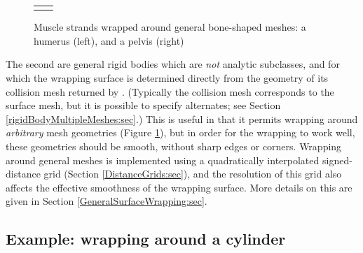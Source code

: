 \begin{figure}[ht]
\begin{center}
\begin{tabular}{cc}
\fi
\end{tabular}
\end{center}
\caption{Muscle strands wrapped around general bone-shaped meshes: a
humerus (left), and a pelvis (right)}
\label{GeneralWrapping:fig}
\end{figure}

The second are general rigid bodies which are {\it not} analytic
subclasses, and for which the wrapping surface is determined directly
from the geometry of its collision mesh returned by
.  (Typically the
collision mesh corresponds to the surface mesh, but it is possible to
specify alternates; see Section \ref{rigidBodyMultipleMeshes:sec}.)
This is useful in that it permits wrapping around {\it arbitrary} mesh
geometries (Figure \ref{GeneralWrapping:fig}), but in order for the
wrapping to work well, these geometries should be smooth, without
sharp edges or corners.  Wrapping around general meshes is implemented
using a quadratically interpolated signed-distance grid (Section
\ref{DistanceGrids:sec}), and the resolution of this grid also affects
the effective smoothness of the wrapping surface. More details on this
are given in Section \ref{GeneralSurfaceWrapping:sec}.

\subsection{Example: wrapping around a cylinder}
\label{CylinderWrapping:sec}


